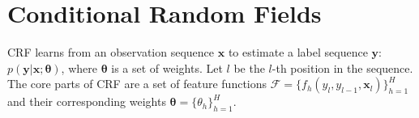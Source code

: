 \documentclass[11pt,a4paper]{article}
\theoremstyle{definition}
\DeclareMathOperator*{\argmax}{arg\,max} %
\begin{document}


\section{Conditional Random Fields}
CRF learns from an observation sequence $\mathbf{x}$ to estimate a label sequence $\mathbf{y}$: $p(\mathbf{y}|\mathbf{x}; \boldsymbol{\theta})$, where $\boldsymbol{\theta}$ is a set of weights. 
Let $l$ be the $l$-th position in the sequence. The core parts of CRF are a set of feature functions $\mathcal {F}=\{f_h(y_{l},y_{l-1},\mathbf{x}_l)\}_{h=1}^{H}$ and their corresponding weights $\boldsymbol{\theta}=\{\theta_h\}_{h=1}^H$. 
\end{document}
